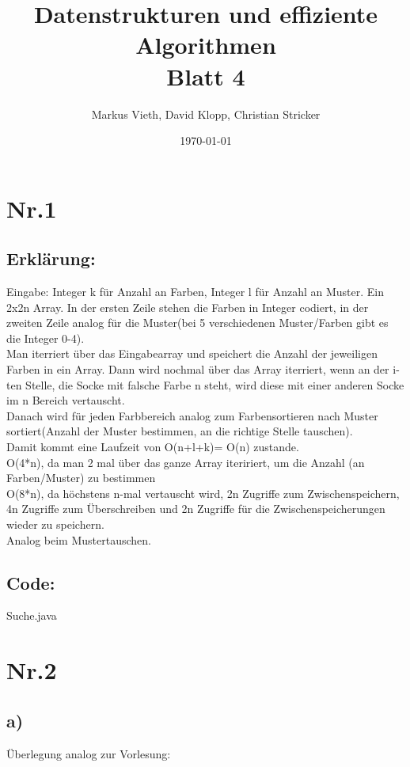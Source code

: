 \documentclass[a4paper,11pt,twoside]{article}
\title{Datenstrukturen und effiziente Algorithmen\\ Blatt 4}
\author{Markus Vieth, David Klopp, Christian Stricker}
\date{\today}
\begin{document}
\maketitle
\cleardoublepage
\pagestyle{myheadings}

\section*{Nr.1}
\subsection*{Erklärung:}
Eingabe: Integer k für Anzahl an Farben, Integer l für Anzahl an Muster. Ein 2x2n Array. In der ersten Zeile stehen die Farben in Integer codiert, in der zweiten Zeile analog für die Muster(bei 5 verschiedenen Muster/Farben gibt es die Integer 0-4).\\
Man iterriert über das Eingabearray und speichert die Anzahl der jeweiligen Farben in ein Array. Dann wird nochmal über das Array iterriert, wenn an der i-ten Stelle, die Socke mit falsche Farbe n steht, wird diese mit einer anderen Socke im n Bereich vertauscht.\\
Danach wird für jeden Farbbereich analog zum Farbensortieren nach Muster sortiert(Anzahl der Muster bestimmen, an die richtige Stelle tauschen).\\
Damit kommt eine Laufzeit von O(n+l+k)= O(n) zustande.\\
O(4*n), da man 2 mal über das ganze Array iteririert, um die Anzahl (an Farben/Muster) zu bestimmen\\
O(8*n), da höchstens n-mal vertauscht wird, 2n Zugriffe zum Zwischenspeichern, 4n Zugriffe zum Überschreiben und 2n Zugriffe für die Zwischenspeicherungen wieder zu speichern.\\
Analog beim Mustertauschen.\\

\subsection*{Code:}
 {Suche.java}


\pagebreak

\section*{Nr.2}
\subsection*{a)}
Überlegung analog zur Vorlesung:\\
\end{document}
